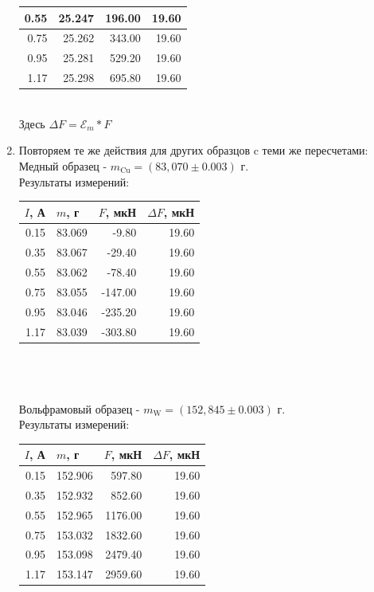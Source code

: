 \documentclass[a4paper,12pt]{extarticle}
\begin{document}
\begin{enumerate}
\begin{tabular}{|r|r|r|r|}
    0.55 & 25.247 & 196.00 & 19.60 \\ \hline
    0.75 & 25.262 & 343.00 & 19.60 \\ \hline
    0.95 & 25.281 & 529.20 & 19.60 \\ \hline
    1.17 & 25.298 & 695.80 & 19.60 \\ \hline
    \end{tabular} \\
    Здесь $\Delta F = \mathcal{E}_m * F$
    \item Повторяем те же действия для других образцов c теми же пересчетами: \\
    Медный образец - $m_{\text{Cu}} = (83,070\pm0.003)$ г. \\
    Результаты измерений: 
    \begin{tabular}{|r|r|r|r|}
    \hline
    \multicolumn{1}{|l|}{$I$, А} & \multicolumn{1}{l|}{$m$, г} & \multicolumn{1}{l|}{$F$, мкН} & \multicolumn{1}{l|}{$\Delta F$, мкН} \\ \hline
    0.15 & 83.069 & -9.80   & 19.60 \\ \hline
    0.35 & 83.067 & -29.40  & 19.60 \\ \hline
    0.55 & 83.062 & -78.40  & 19.60 \\ \hline
    0.75 & 83.055 & -147.00 & 19.60 \\ \hline
    0.95 & 83.046 & -235.20 & 19.60 \\ \hline
    1.17 & 83.039 & -303.80 & 19.60 \\ \hline
    \end{tabular} \\ \\ \\
    Вольфрамовый образец - $m_{\text{W}} = (152,845\pm0.003)$ г. \\
    Результаты измерений: 
    \begin{tabular}{|r|r|r|r|}
    \hline
    \multicolumn{1}{|l|}{$I$, А} & \multicolumn{1}{l|}{$m$, г} & \multicolumn{1}{l|}{$F$, мкН} & \multicolumn{1}{l|}{$\Delta F$, мкН} \\ \hline
    0.15 & 152.906 & 597.80  & 19.60 \\ \hline
    0.35 & 152.932 & 852.60  & 19.60 \\ \hline
    0.55 & 152.965 & 1176.00 & 19.60 \\ \hline
    0.75 & 153.032 & 1832.60 & 19.60 \\ \hline
    0.95 & 153.098 & 2479.40 & 19.60 \\ \hline
    1.17 & 153.147 & 2959.60 & 19.60 \\ \hline

\end{tabular}
\end{enumerate}
\end{document}
